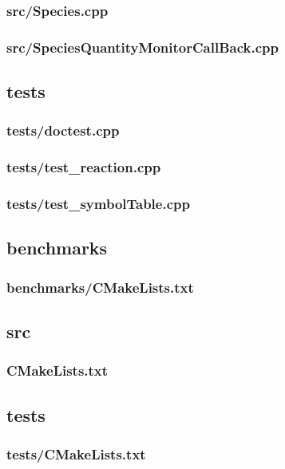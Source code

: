 \subsubsection{src/Species.cpp}

\newpage
\subsubsection{src/SpeciesQuantityMonitorCallBack.cpp}

\newpage
\subsection{tests}
\subsubsection{tests/doctest.cpp}

\newpage
\subsubsection{tests/test\_reaction.cpp}

\newpage
\subsubsection{tests/test\_symbolTable.cpp}

\newpage
\subsection{benchmarks}
\subsubsection{benchmarks/CMakeLists.txt}

\newpage
\subsection{src}
\subsubsection{CMakeLists.txt}

\newpage
\subsection{tests}
\subsubsection{tests/CMakeLists.txt}


